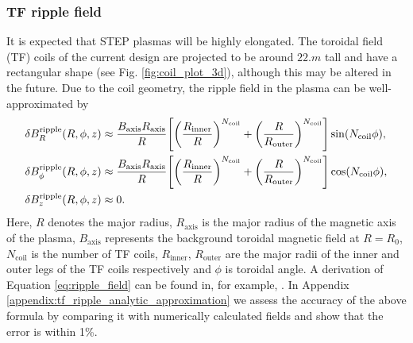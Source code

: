 \documentclass[10pt, a4paper, twoside]{article}
\begin{document}
\subsubsection{TF ripple field}
\label{sec:tf_ripple_field}

It is expected that STEP plasmas will be highly elongated. The toroidal field (TF) coils of the current design are projected to be around $\si{22.m}$ tall and have a rectangular shape (see Fig. \ref{fig:coil_plot_3d}), although this may be altered in the future. Due to the coil geometry, the ripple field in the plasma can be well-approximated by
\begin{equation}
    \label{eq:ripple_field}
    \begin{aligned}
        \delta B_R^{\text{ripple}}(R, \phi, z) &\approx \frac{B_\text{axis} R_\text{axis}}{R}\qty[\qty(\frac{R_\text{inner}}{R})^{N_\text{coil}} + \qty(\frac{R}{R_{\text{outer}}})^{N_\text{coil}}]\sin(N_{\text{coil}}\phi), \\
        \delta B_\phi^{\text{ripple}}(R, \phi, z) &\approx \frac{B_\text{axis} R_\text{axis}}{R}\qty[ \qty(\frac{R_\text{inner}}{R})^{N_\text{coil}} + \qty(\frac{R}{R_{\text{outer}}})^{N_\text{coil}}]\cos(N_{\text{coil}}\phi),\\
        \delta B_z^{\text{ripple}}(R, \phi, z) &\approx 0.
    \end{aligned}
\end{equation}
Here, $R$ denotes the major radius, $R_\text{axis}$ is the major radius of the magnetic axis of the plasma, $B_\text{axis}$ represents the background toroidal magnetic field at $R=R_0$, $N_{\text{coil}}$ is the number of TF coils, $R_\text{inner}$, $R_\text{outer}$ are the major radii of the inner and outer legs of the TF coils respectively and $\phi$ is toroidal angle. A derivation of Equation \eqref{eq:ripple_field} can be found in, for example, \cite{mcclements2005}. In Appendix \ref{appendix:tf_ripple_analytic_approximation} we assess the accuracy of the above formula by comparing it with numerically calculated fields and show that the error is within 1\%.
\end{document}
